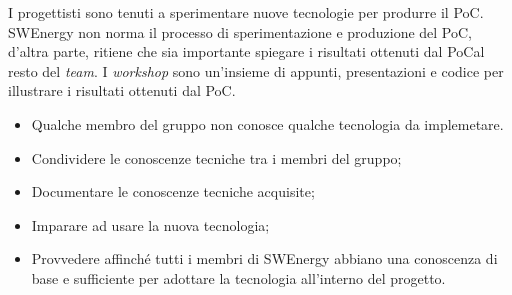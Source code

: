 \label{organizzare-workshop}

I progettisti sono tenuti a sperimentare nuove tecnologie per produrre il PoC\g.
SWEnergy non norma il processo di sperimentazione e produzione del PoC\g, d'altra parte, ritiene che sia importante spiegare i risultati ottenuti dal PoC\g al resto del \textit{team}. I \textit{workshop} sono un'insieme di appunti, presentazioni e codice per illustrare i risultati ottenuti dal PoC\g.

\begin{itemize}
	\item Qualche membro del gruppo non conosce qualche tecnologia da
	      implemetare.
\end{itemize}

\begin{itemize}
	\item Condividere le conoscenze tecniche tra i membri del gruppo;

	\item Documentare le conoscenze tecniche acquisite;

	\item Imparare ad usare la nuova tecnologia;

	\item Provvedere affinché tutti i membri di SWEnergy abbiano una conoscenza
	      di base e sufficiente per adottare la tecnologia all'interno del
	      progetto.
\end{itemize}

